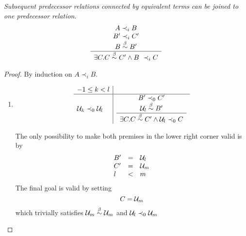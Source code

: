 \begin{lemma}
    \label{PrecedenceEqTransitive}
    \emph{Subsequent predecessor relations connected by equivalent terms can be
    joined to one predecessor relation}.
    $$
    \ruleh{
        A \prec_i B
        \\
        B' \prec_i C'
        \\
        B \betaeq B'
    }
    {
        \exists C. C \betaeq C' \land B \prec_i C
    }
    $$

    \begin{proof}
        By induction on $A \prec_i B$.
        \begin{enumerate}
        \item
            $$
            \begin{array}{l|l}
                -1 \le k < l
                \\
                \hline
                {\cal U}_k \prec_0 {\cal U}_l
                &
                \begin{array}{c} 
                    B' \prec_0 C'
                    \\
                    {\cal U}_l \stackrel{\beta}{\sim} B'
                 \\ \hline 
                    \exists C. C \stackrel{\beta}{\sim} C' \land {\cal U}_l \prec_0 C
                \end{array}
            \end{array}
            $$

            The only possibility to make both premises in the lower right corner
                valid is by
            $$
            \begin{array}{lll}
                B' &=& {\cal U}_l
                \\
                C' &=& {\cal U}_m
                \\
                l &<& m
            \end{array}
            $$
            The final goal is valid by setting
            $$
                C = {\cal U}_m
            $$
            which trivially satisfies ${\cal U}_m \stackrel{\beta}{\sim} {\cal U}_m$ and ${\cal U}_l
            \prec_0 {\cal U}_m$



\end{enumerate}
\end{proof}
\end{lemma}
